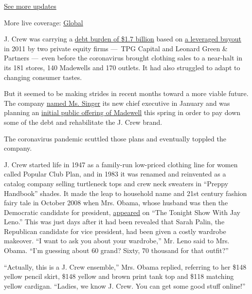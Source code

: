 \href{https://www.nytimes3xbfgragh.onion/live/2020/08/03/business/stock-market-today-coronavirus?action=click\&pgtype=Article\&state=default\&region=MAIN_CONTENT_1\&context=storylines_live_updates}{See
more updates}

More live coverage:
\href{https://www.nytimes3xbfgragh.onion/2020/08/03/world/coronavirus-covid-19.html?action=click\&pgtype=Article\&state=default\&region=MAIN_CONTENT_1\&context=storylines_live_updates}{Global}

J. Crew was carrying a
\href{https://investors.jcrew.com/static-files/7e60f08e-e8c7-454b-8b7c-d78ec412efcc}{debt
burden of \$1.7 billion} based on
\href{https://dealbook.nytimes3xbfgragh.onion/2011/03/01/j-crew-shareholders-approve-buyout/}{a
leveraged buyout} in 2011 by two private equity firms ---~TPG Capital
and Leonard Green \& Partners ---~even before the coronavirus brought
clothing sales to a near-halt in its 181 stores, 140 Madewells and 170
outlets. It had also struggled to adapt to changing consumer tastes.

But it seemed to be making strides in recent months toward a more viable
future. The company
\href{https://www.nytimes3xbfgragh.onion/2020/01/28/business/j-crew-jan-singer.html}{named
Ms. Singer} its new chief executive in January and was planning an
\href{https://www.nytimes3xbfgragh.onion/2019/09/17/business/madewell-ipo-j-crew.html}{initial
public offering of Madewell} this spring in order to pay down some of
the debt and rehabilitate the J. Crew brand.

The coronavirus pandemic scuttled those plans and eventually toppled the
company.

J. Crew started life in 1947 as a family-run low-priced clothing line
for women called Popular Club Plan, and in 1983 it was renamed and
reinvented as a catalog company selling turtleneck tops and crew neck
sweaters in ``Preppy Handbook'' shades. It made the leap to household
name and 21st century fashion fairy tale in October 2008 when Mrs.
Obama, whose husband was then the Democratic candidate for president,
\href{https://www.nytimes3xbfgragh.onion/2008/11/17/business/media/17crew.html}{appeared}
on ``The Tonight Show With Jay Leno.'' This was just days after it had
been revealed that Sarah Palin, the Republican candidate for vice
president, had been given a costly wardrobe makeover. ``I want to ask
you about your wardrobe,'' Mr. Leno said to Mrs. Obama. ``I'm guessing
about 60 grand? Sixty, 70 thousand for that outfit?''

``Actually, this is a J. Crew ensemble,'' Mrs. Obama replied, referring
to her \$148 yellow pencil skirt, \$148 yellow and brown print tank top
and \$118 matching yellow cardigan. ``Ladies, we know J. Crew. You can
get some good stuff online!''

